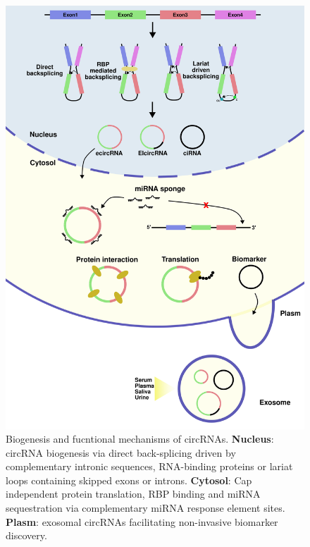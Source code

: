 \documentclass[journal,review,submit,pdftex,moreauthors]{Definitions/mdpi}
\begin{document}
\begin{figure}
    \begin{center}
        \includegraphics[width=\textwidth]{biogenesis.png}
        \caption{Biogenesis and fucntional mechanisms of circRNAs. \textbf{Nucleus}: circRNA biogenesis via direct back-splicing driven by complementary intronic sequences, RNA-binding proteins or lariat loops containing skipped exons or introns. \textbf{Cytosol}: Cap independent protein translation, RBP binding and miRNA sequestration via complementary miRNA response element sites. \textbf{Plasm}: exosomal circRNAs facilitating non-invasive biomarker discovery.}
        \label{biogen}
    \end{center}
\end{figure}
\end{document}

